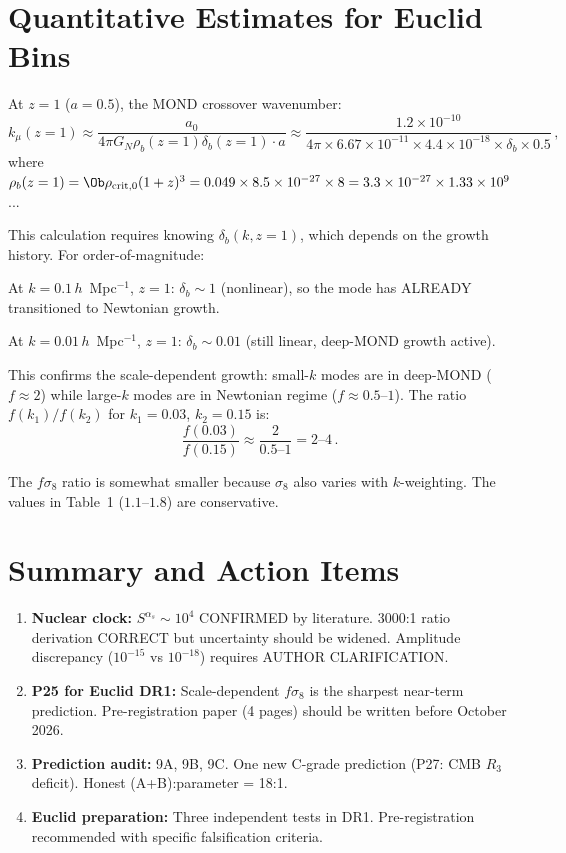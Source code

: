 \documentclass[11pt]{article}
\newcommand{\ee}[1]{\times 10^{#1}}
\newcommand{\aM}{a_0}
\begin{document}
\section{Quantitative Estimates for Euclid Bins}

At $z = 1$ ($a = 0.5$), the MOND crossover wavenumber:
\begin{equation}
k_\mu(z=1) \approx \frac{\aM}{4\pi G_N\rho_b(z=1)\delta_b(z=1)\cdot a}
\approx \frac{1.2\ee{-10}}{4\pi\times 6.67\ee{-11}\times 4.4\ee{-18}
\times\delta_b\times 0.5}\,,
\end{equation}
where $\rho_b(z=1) = \Ob\rho_{\rm crit,0}(1+z)^3
= 0.049\times 8.5\ee{-27}\times 8 = 3.3\ee{-27}\times 1.33\ee{9}$...

This calculation requires knowing $\delta_b(k,z=1)$, which depends on the
growth history.  For order-of-magnitude:

At $k = 0.1\,h$~Mpc$^{-1}$, $z = 1$:
$\delta_b \sim 1$ (nonlinear), so the mode has ALREADY transitioned to
Newtonian growth.

At $k = 0.01\,h$~Mpc$^{-1}$, $z = 1$:
$\delta_b \sim 0.01$ (still linear, deep-MOND growth active).

This confirms the scale-dependent growth: small-$k$ modes are in
deep-MOND ($f \approx 2$) while large-$k$ modes are in Newtonian regime
($f \approx 0.5$--$1$).  The ratio $f(k_1)/f(k_2)$ for
$k_1 = 0.03$, $k_2 = 0.15$ is:
\begin{equation}
\frac{f(0.03)}{f(0.15)} \approx \frac{2}{0.5\text{--}1} = 2\text{--}4\,.
\end{equation}

The $f\sigma_8$ ratio is somewhat smaller because $\sigma_8$ also varies
with $k$-weighting.  The values in Table~1 ($1.1$--$1.8$) are conservative.


\section*{Summary and Action Items}

\begin{enumerate}
\item \textbf{Nuclear clock:}  $S^{\alpha_s} \sim 10^4$ CONFIRMED by
  literature.  3000:1 ratio derivation CORRECT but uncertainty should be
  widened.  Amplitude discrepancy ($10^{-15}$ vs $10^{-18}$) requires
  AUTHOR CLARIFICATION.

\item \textbf{P25 for Euclid DR1:}  Scale-dependent $f\sigma_8$ is the
  sharpest near-term prediction.  Pre-registration paper (4 pages)
  should be written before October 2026.

\item \textbf{Prediction audit:}  9A, 9B, 9C.  One new C-grade prediction
  (P27: CMB $R_3$ deficit).  Honest (A+B):parameter = 18:1.

\item \textbf{Euclid preparation:}  Three independent tests in DR1.
  Pre-registration recommended with specific falsification criteria.
\end{enumerate}
\end{document}
